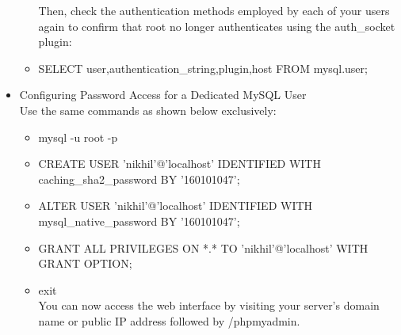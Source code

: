 \documentclass[10pt]{report}
\begin{document}
\begin{itemize}
\begin{itemize}
Then, check the authentication methods employed by each of your users again to confirm that root no longer authenticates using the auth\_socket plugin:
\item{SELECT user,authentication\_string,plugin,host FROM mysql.user;}
\end{itemize}
\item{Configuring Password Access for a Dedicated MySQL User}
\\ Use the same commands as shown below exclusively:
\begin{itemize}
\item{mysql -u root -p}
\item{
CREATE USER 'nikhil'@'localhost' IDENTIFIED WITH caching\_sha2\_password BY '160101047';}
\item{
ALTER USER 'nikhil'@'localhost' IDENTIFIED WITH mysql\_native\_password BY '160101047';}
\item{
GRANT ALL PRIVILEGES ON *.* TO 'nikhil'@'localhost' WITH GRANT OPTION;}
\item{
exit}
\\ You can now access the web interface by visiting your server’s domain name or public IP address followed by /phpmyadmin.
\end{itemize}
\end{itemize}
\newpage
\end{document}
